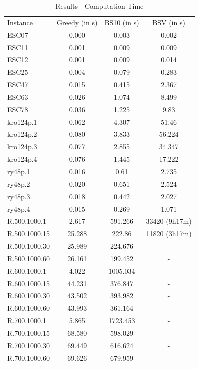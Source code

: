 \documentclass[]{article}
\begin{document}

	\begin{table}[htb]
		\begin{tabular}{lccc}
			Instance & Greedy (in s) & BS10 (in s) & BSV (in s)\\
			ESC07 & 0.000 & 0.003 & 0.002\\
			ESC11 & 0.001 & 0.009 & 0.009\\
			ESC12 & 0.001 & 0.009 & 0.014\\
			ESC25 & 0.004 & 0.079 & 0.283\\
			ESC47 & 0.015 & 0.415 & 2.367\\
			ESC63 & 0.026 & 1.074 & 8.499\\
			ESC78 & 0.036 & 1.225 & 9.83\\
			kro124p.1 & 0.062 & 4.307 & 51.46\\
			kro124p.2 & 0.080 & 3.833 & 56.224\\
			kro124p.3 & 0.077 & 2.855 & 34.347\\
			kro124p.4 & 0.076 & 1.445 & 17.222\\
			ry48p.1   & 0.016 & 0.61 & 2.735\\
			ry48p.2   & 0.020 & 0.651 & 2.524\\
			ry48p.3   & 0.018 & 0.442 & 2.027\\
			ry48p.4   & 0.015 & 0.269 & 1.071\\
			R.500.1000.1  & 2.617 & 591.266 & 33420 (9h17m)\\
			R.500.1000.15 & 25.288 & 222.86 & 11820 (3h17m)\\
			R.500.1000.30 & 25.989 & 224.676 & -\\
			R.500.1000.60 & 26.161 & 199.452 & -\\
			R.600.1000.1  & 4.022 & 1005.034 & -\\
			R.600.1000.15 & 44.231 & 376.847 & -\\
			R.600.1000.30 & 43.502 & 393.982 & -\\
			R.600.1000.60 & 43.993 & 361.164 & -\\
			R.700.1000.1  & 5.865 & 1723.453 & -\\
			R.700.1000.15 & 68.580 & 598.029 & -\\
			R.700.1000.30 & 69.449 & 616.624 & -\\
			R.700.1000.60 & 69.626 & 679.959 & -\\
		\end{tabular}
		\caption{Results - Computation Time}
		\label{table:results_time}
	\end{table}





    \newpage

	 
	
\end{document}
